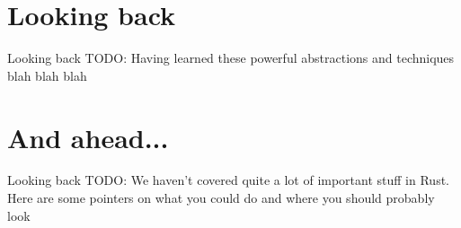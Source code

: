 \documentclass[usenames,dvipsnames,10pt,aspectratio=169]{beamer}
\begin{document}

\section{Looking back}

\begin{frame}{Looking back}
	\large
\textcolor{ucured}{TODO: Having learned these powerful abstractions
and techniques blah blah blah}
	
\end{frame}


\section{And ahead...}

\begin{frame}{Looking back}
	\large
\textcolor{ucured}{TODO: We haven't covered quite a lot of important
stuff in Rust. Here are some pointers on what you could do and 
where you should probably look}
	
\end{frame}

\end{document}
